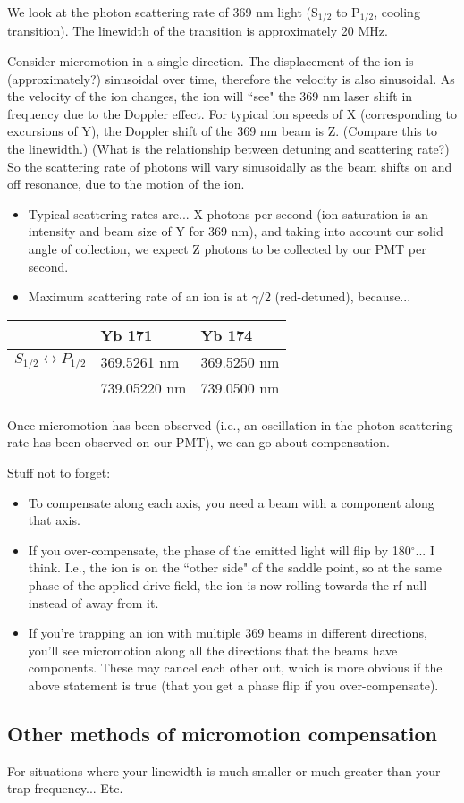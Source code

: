 \documentclass{article}
\begin{document}
We look at the photon scattering rate of 369 nm light (S$_{1/2}$ to P$_{1/2}$, cooling transition). The linewidth of the transition is approximately 20 MHz.  

Consider micromotion in a single direction. The displacement of the ion is (approximately?) sinusoidal over time, therefore the velocity is also sinusoidal. As the velocity of the ion changes, the ion will ``see" the 369 nm laser shift in frequency due to the Doppler effect. For typical ion speeds of X (corresponding to excursions of Y), the Doppler shift of the 369 nm beam is Z. (Compare this to the linewidth.) (What is the relationship between detuning and scattering rate?) So the scattering rate of photons will vary sinusoidally as the beam shifts on and off resonance, due to the motion of the ion.

\begin{itemize}
\item Typical scattering rates are... X photons per second (ion saturation is an intensity and beam size of Y for 369 nm), and taking into account our solid angle of collection, we expect Z photons to be collected by our PMT per second.
\item Maximum scattering rate of an ion is at $\gamma /2$ (red-detuned), because...
\end{itemize}

\vspace{0mm}
\begin{center}
\begin{tabular}{l l l} \toprule
& \textbf{Yb 171} & \textbf{Yb 174} \\ \midrule
$S_{1/2} \leftrightarrow P_{1/2}$ & 369.5261 nm & 369.5250 nm \\
 & 739.05220 nm & 739.0500 nm \\  
\bottomrule
\end{tabular}
\end{center}

Once micromotion has been observed (i.e., an oscillation in the photon scattering rate has been observed on our PMT), we can go about compensation.


Stuff not to forget:

\begin{itemize}
\item To compensate along each axis, you need a beam with a component along that axis.
\item If you over-compensate, the phase of the emitted light will flip by 180$^{\circ}$... I think. I.e., the ion is on the ``other side" of the saddle point, so at the same phase of the applied drive field, the ion is now rolling towards the rf null instead of away from it.
\item If you're trapping an ion with multiple 369 beams in different directions, you'll see micromotion along all the directions that the beams have components. These may cancel each other out, which is more obvious if the above statement is true (that you get a phase flip if you over-compensate).
\end{itemize}


\subsection*{Other methods of micromotion compensation}

For situations where your linewidth is much smaller or much greater than your trap frequency... Etc.
\end{document}
